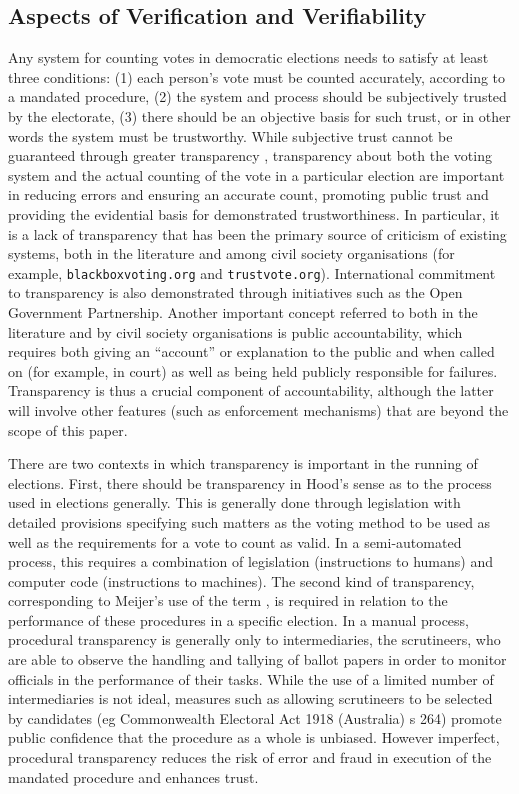 \subsection{Aspects of Verification and Verifiability}
Any system for counting votes in democratic elections needs to
satisfy at least three conditions: (1) each person's vote must be
counted accurately, according to a mandated procedure, (2) the
system and process should be subjectively trusted by the electorate,
(3) there should be an objective basis for such trust, or in other
words the system must be trustworthy. While subjective trust cannot
be guaranteed through greater transparency \citep{ONeill:2002:QT}, transparency about
both the voting system and the actual counting of the vote in a
particular election are important in reducing errors and ensuring an
accurate count, promoting public trust and providing the evidential
basis for demonstrated trustworthiness. In particular, it is a lack
of transparency that has been the primary source of criticism of
existing systems, both in the literature
\citep{Carrier:2012:VCT,Conway:2017:ANS} and among civil
society organisations \citep{Vogl:2012:WWC} (for example,
\texttt{blackboxvoting.org} and
\texttt{trustvote.org}). International commitment to transparency is also
demonstrated through initiatives such as the Open Government
Partnership. Another important concept referred to both in the
literature and by civil society organisations is public
accountability, which requires both giving an “account” or
explanation to the public and when called on (for example, in court)
as well as being held publicly responsible for failures.
Transparency is thus a crucial component of accountability, although
the latter will involve other features (such as enforcement
mechanisms) that are beyond the scope of this paper. 

There are two contexts in which transparency is important in the
running of elections. First, there should be transparency in Hood's
sense \cite{Hood:2001:T} as to the process used in elections generally. This is
generally done through legislation with detailed provisions
specifying such matters as the voting method to be used 
 as well as the requirements for a vote to count as valid.
In a semi-automated process, this requires a combination of
legislation (instructions to humans) and computer code (instructions
to machines). The second kind of transparency, corresponding to
Meijer’s use of the term \citep{Meijer:2014:T}, is required in relation to the
performance of these procedures in a specific election. In a manual
process, procedural transparency is generally only to
intermediaries, the scrutineers, who are able to observe the
handling and tallying of ballot papers in order to monitor officials
in the performance of their tasks. While the use of a limited number
of intermediaries is not ideal, measures such as allowing
scrutineers to be selected by candidates (eg Commonwealth Electoral
Act 1918 (Australia) s 264) promote public confidence that the
procedure as a whole is unbiased. However imperfect, procedural
transparency reduces the risk of error and fraud in execution of the
mandated procedure and enhances trust. 

